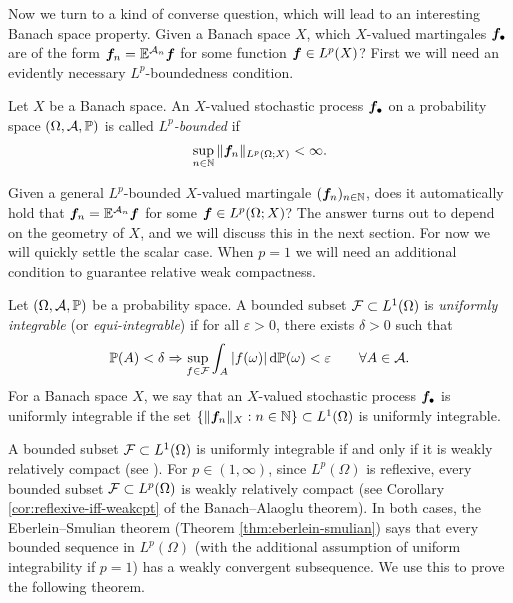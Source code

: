 Now we turn to a kind of converse question, which will lead to an interesting Banach space property.
Given a Banach space $X$, which $X$-valued martingales $\bm{f}_{\bullet}$ are of the form $\bm{f}_{n} = \mathbb{E}^{\mathcal{A}_{n}} \bm{f}$ for some function $\bm{f} \in L^p(X)$?
First we will need an evidently necessary $L^p$-boundedness condition.

\begin{defn}
  Let $X$ be a Banach space.
  An $X$-valued stochastic process $\bm{f}_{\bullet}$ on a probability space $(\Omega,\mathcal{A},\mathbb{P})$ is called \emph{$L^p$-bounded} if
  \begin{equation*}
    \sup_{n \in \mathbb{N}} \|\bm{f}_n\|_{L^p(\Omega;X)} < \infty.
  \end{equation*}
\end{defn}

Given a general $L^p$-bounded $X$-valued martingale $(\bm{f}_n)_{n \in \mathbb{N}}$, does it automatically hold that $\bm{f}_n = \mathbb{E}^{\mathcal{A}_n} \bm{f}$ for some $\bm{f} \in L^p(\Omega;X)$?
The answer turns out to depend on the geometry of $X$, and we will discuss this in the next section.
For now we will quickly settle the scalar case.
When $p=1$ we will need an additional condition to guarantee relative weak compactness.

\begin{defn}\label{defn:UI}
  Let $(\Omega,\mathcal{A},\mathbb{P})$ be a probability space.
  A bounded subset $\mathcal{F} \subset L^1(\Omega)$ is \emph{uniformly integrable} (or \emph{equi-integrable}) if for all $\varepsilon > 0$, there exists $\delta > 0$ such that
  \begin{equation*}
    \mathbb{P}(A) < \delta \Rightarrow \sup_{f \in \mathcal{F}} \int_{A} |f(\omega)| \, \mathrm{d}\mathbb{P}(\omega) < \varepsilon \qquad \forall A \in \mathcal{A}.
  \end{equation*}
  For a Banach space $X$, we say that an $X$-valued stochastic process $\bm{f}_{\bullet}$ is uniformly integrable if the set $\{\|\bm{f}_n\|_{X} : n \in \mathbb{N}\} \subset L^1(\Omega)$ is uniformly integrable. 
\end{defn}

A bounded subset $\mathcal{F} \subset L^1(\Omega)$ is uniformly integrable if and only if it is weakly relatively compact (see \cite[Theorem 5.2.9]{AK06}).
For $p \in (1,\infty)$, since $L^p(\Omega)$ is reflexive, every bounded subset $\mathcal{F} \subset L^p(\Omega)$ is weakly relatively compact (see Corollary \ref{cor:reflexive-iff-weakcpt} of the Banach--Alaoglu theorem).
In both cases, the Eberlein--Smulian theorem (Theorem \ref{thm:eberlein-smulian}) says that every bounded sequence in $L^p(\Omega)$ (with the additional assumption of uniform integrability if $p=1$) has a weakly convergent subsequence.
We use this to prove the following theorem.

